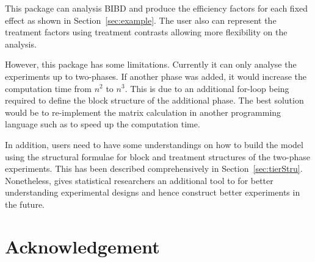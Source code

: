\documentclass[article]{jss}
\begin{document}
This package can analysis BIBD and produce the efficiency factors for each fixed effect as shown in Section~\ref{sec:example}. The user also can represent the treatment factors using treatment contrasts allowing more flexibility on the analysis.

However, this package has some limitations. Currently it can only analyse the experiments up to two-phases. If another phase was added, it would increase the computation time from $n^2$ to $n^3$. This is due to an additional for-loop being required to define the block structure of the additional phase. The best solution would be to re-implement the matrix calculation in another programming language such as  to speed up the computation time.

In addition, users need to have some understandings on how to build the model using the structural formulae for block and treatment structures of the two-phase experiments. This has been described comprehensively in Section~\ref{sec:tierStru}. Nonetheless,  gives statistical researchers an additional tool to for better understanding experimental designs and hence construct better experiments in the future.

\section*{Acknowledgement}



\end{document}
